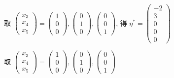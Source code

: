          取
         \( \begin{pmatrix}
             x_{3} \\
             x_{4} \\
             x_{5}
         \end{pmatrix} = \begin{pmatrix}
             1 \\
             0 \\
             0
         \end{pmatrix}, \begin{pmatrix}
             0 \\
             1 \\
             0
         \end{pmatrix}, \begin{pmatrix}
             0 \\
             0 \\
             1
         \end{pmatrix}\), 得 \(\eta^{*} = \begin{pmatrix}
             -2 \\
             3  \\
             0  \\
             0  \\
             0
         \end{pmatrix} \)

         取 \( \begin{pmatrix}
             x_{3} \\
             x_{4} \\
             x_{5}
         \end{pmatrix} = \begin{pmatrix}
             1 \\
             0 \\
             0
         \end{pmatrix}, \begin{pmatrix}
             0 \\
             1 \\
             0
         \end{pmatrix}, \begin{pmatrix}
             0 \\
             0 \\
             1
         \end{pmatrix} \)

